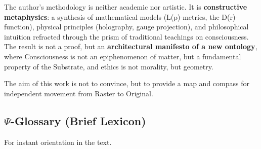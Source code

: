 \documentclass[a4paper,12pt]{article}
\begin{document}
	The author's methodology is neither academic nor artistic. It is \textbf{constructive metaphysics}: a synthesis of mathematical models (L(p)-metrics, the D(r)-function), physical principles (holography, gauge projection), and philosophical intuition refracted through the prism of traditional teachings on consciousness. The result is not a proof, but an \textbf{architectural manifesto of a new ontology}, where Consciousness is not an epiphenomenon of matter, but a fundamental property of the Substrate, and ethics is not morality, but geometry.
	
	The aim of this work is not to convince, but to provide a map and compass for independent movement from Raster to Original.
	
	\subsection{$\Psi$-Glossary (Brief Lexicon)}
	
	For instant orientation in the text.
	
\end{document}
